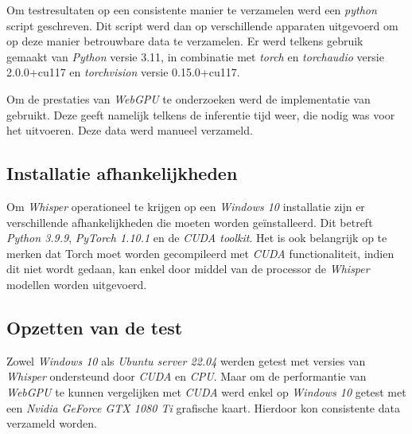 \bigbreak{}

Om testresultaten op een consistente manier te verzamelen werd een \textit{python} script geschreven. Dit script werd dan op verschillende apparaten uitgevoerd om op deze manier betrouwbare data te verzamelen. Er werd telkens gebruik gemaakt van \textit{Python} versie 3.11, in combinatie met \textit{torch} en \textit{torchaudio} versie 2.0.0+cu117 en \textit{torchvision} versie 0.15.0+cu117.

\bigbreak{}

Om de prestaties van \textit{WebGPU} te onderzoeken werd de implementatie van \textcite{Fleetwood2024} gebruikt. Deze geeft namelijk telkens de inferentie tijd weer, die nodig was voor het uitvoeren. Deze data werd manueel verzameld.

\bigbreak{}

\subsection*{Installatie afhankelijkheden}

Om \textit{Whisper} operationeel te krijgen op een \textit{Windows 10} installatie zijn er verschillende afhankelijkheden die moeten worden geïnstalleerd. Dit betreft \textit{Python 3.9.9}, \textit{PyTorch 1.10.1} en de \textit{CUDA toolkit}. Het is ook belangrijk op te merken dat Torch moet worden gecompileerd met \textit{CUDA} functionaliteit, indien dit niet wordt gedaan, kan enkel door middel van de processor de \textit{Whisper} modellen worden uitgevoerd.

\subsection*{Opzetten van de test}

Zowel \textit{Windows 10} als \textit{Ubuntu server 22.04} werden getest met versies van \textit{Whisper} ondersteund door \textit{CUDA} en \textit{CPU}. Maar om de performantie van \textit{WebGPU} te kunnen vergelijken met \textit{CUDA} werd enkel op \textit{Windows 10} getest met een \textit{Nvidia GeForce GTX 1080 Ti} grafische kaart. Hierdoor kon consistente data verzameld worden.

\break{}



